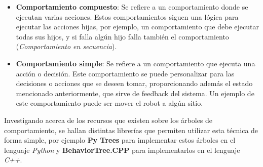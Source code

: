 \documentclass[../main.tex]{subfiles}
\begin{document}
\begin{itemize}
    \item \textbf{Comportamiento compuesto}: Se refiere a un comportamiento donde se ejecutan varias acciones. Estos comportamientos siguen una lógica para ejecutar las acciones hijas, por ejemplo, un comportamiento
    que debe ejecutar todas sus hijos, y si falla algún hijo falla también el comportamiento (\textit{Comportamiento en secuencia}).
    \item \textbf{Comportamiento simple}: Se refiere a un comportamiento que ejecuta una acción o decisión. Este comportamiento se puede personalizar para las decisiones o acciones que se deseen tomar, proporcionando además
    el estado mencionado anteriormente, que sirve de feedback del sistema. Un ejemplo de este comportamiento puede ser mover el robot a algún sitio.
\end{itemize}

Investigando acerca de los recursos que existen sobre los árboles de comportamiento, se hallan distintas librerías que permiten utilizar esta técnica de forma simple, por ejemplo \textbf{Py Trees} para implementar
estos árboles en el lenguaje \textit{Python} y \textbf{BehaviorTree.CPP} para implementarlos en el lenguaje \textit{C++}.
\end{document}
